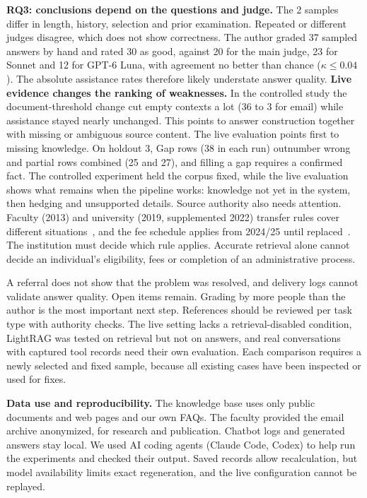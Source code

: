 \documentclass[a4paper,10pt,twocolumn]{article}
\begin{document}
\textbf{RQ3: conclusions depend on the questions and judge.} The 2 samples differ in length, history, selection and prior examination. Repeated or different judges disagree, which does not show correctness. The author graded 37 sampled answers by hand and rated 30 as good, against 20 for the main judge, 23 for Sonnet and 12 for GPT-6 Luna, with agreement no better than chance ($\kappa\leq0.04$). The absolute assistance rates therefore likely understate answer quality.
\textbf{Live evidence changes the ranking of weaknesses.} In the controlled study the document-threshold change cut empty contexts a lot (36 to 3 for email) while assistance stayed nearly unchanged. This points to answer construction together with missing or ambiguous source content. The live evaluation points first to missing knowledge. On holdout 3, Gap rows (38 in each run) outnumber wrong and partial rows combined (25 and 27), and filling a gap requires a confirmed fact. The controlled experiment held the corpus fixed, while the live evaluation shows what remains when the pipeline works: knowledge not yet in the system, then hedging and unsupported details.
Source authority also needs attention. Faculty (2013) and university (2019, supplemented 2022) transfer rules cover different situations~\cite{finki2013study,ukim2019study,ukim2022supplement}, and the fee schedule applies from 2024/25 until replaced~\cite{finki2024fees}. The institution must decide which rule applies. Accurate retrieval alone cannot decide an individual's eligibility, fees or completion of an administrative process.

A referral does not show that the problem was resolved, and delivery logs cannot validate answer quality. Open items remain. Grading by more people than the author is the most important next step. References should be reviewed per task type with authority checks. The live setting lacks a retrieval-disabled condition, LightRAG was tested on retrieval but not on answers, and real conversations with captured tool records need their own evaluation. Each comparison requires a newly selected and fixed sample, because all existing cases have been inspected or used for fixes.

\textbf{Data use and reproducibility.} The knowledge base uses only public documents and web pages and our own FAQs. The faculty provided the email archive anonymized, for research and publication. Chatbot logs and generated answers stay local. We used AI coding agents (Claude Code, Codex) to help run the experiments and checked their output. Saved records allow recalculation, but model availability limits exact regeneration, and the live configuration cannot be replayed.
\end{document}
